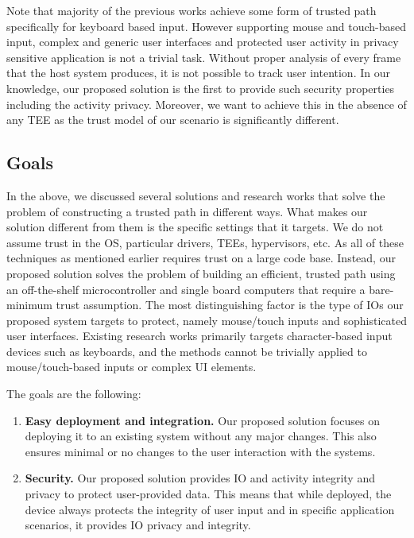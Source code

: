 Note that majority of the previous works achieve some form of trusted path specifically for keyboard based input. However supporting mouse and touch-based input, complex and generic user interfaces and protected user activity in privacy sensitive application is not a trivial task. Without proper analysis of every frame that the host system produces, it is not possible to track user intention. In our knowledge, our proposed solution is the first to provide such security properties including the activity privacy. Moreover, we want to achieve this in the absence of any TEE as the trust model of our scenario is significantly different. 


\subsection{Goals}

In the above, we discussed several solutions and research works that solve the problem of constructing a trusted path in different ways. What makes our solution different from them is the specific settings that it targets. We do not assume trust in the OS, particular drivers, TEEs, hypervisors, etc. As all of these techniques as mentioned earlier requires trust on a large code base. Instead, our proposed solution solves the problem of building an efficient, trusted path using an off-the-shelf microcontroller and single board computers that require a bare-minimum trust assumption. The most distinguishing factor is the type of IOs our proposed system targets to protect, namely mouse/touch inputs and sophisticated user interfaces. Existing research works primarily targets character-based input devices such as keyboards, and the methods cannot be trivially applied to mouse/touch-based inputs or complex UI elements. 

The goals are the following:

\begin{enumerate}
  \item \textbf{Easy deployment and integration.} Our proposed solution focuses on deploying it to an existing system without any major changes. This also ensures minimal or no changes to the user interaction with the systems.
  \item \textbf{Security.} Our proposed solution provides IO and activity integrity and privacy to protect user-provided data. This means that while deployed, the device always protects the integrity of user input and in specific application scenarios, it provides IO privacy and integrity.
\end{enumerate}
